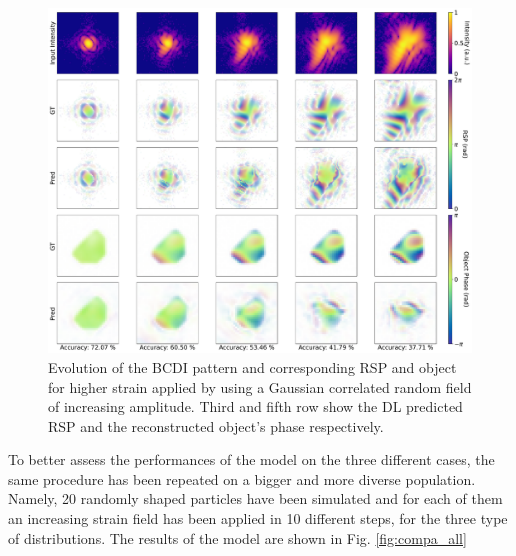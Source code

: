 \begin{figure}[H]
    \centering
    \includegraphics[width=\textwidth]{figures/Phasing/performance_random.pdf}
    \caption{Evolution of the BCDI pattern and corresponding RSP and object for higher strain applied by using a Gaussian
    correlated random field of increasing amplitude. Third and fifth row show the DL predicted RSP and the reconstructed 
    object's phase respectively. }
    \label{fig:random1}
\end{figure}

To better assess the performances of the model on the three different cases, the same procedure has been repeated on a 
bigger and more diverse population. Namely, 20 randomly shaped particles have been simulated and for each of them an 
increasing strain field has been applied in 10 different steps, for the three type of distributions. The results of 
the model are shown in Fig. \ref{fig:compa_all}

